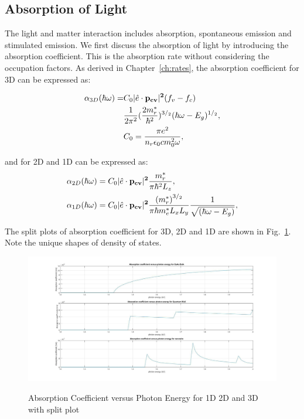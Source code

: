\subsection{Absorption of Light}

The light and matter interaction includes absorption, spontaneous emission and
stimulated emission. We first discuss the absorption of light by introducing
the absorption coefficient. This is the absorption rate without considering
the occupation factors. As derived in Chapter~\ref{ch:rates}, the absorption coefficient for 3D can be expressed as:


\begin{equation}
\begin{aligned}
    \alpha_{3D}(\hbar\omega)= & C_0{|\hat{e}\cdot\bf{p}_{cv}|^2}(f_v-f_c)\\
    & \frac{1}{2\pi^2}(\frac{2m_r^\ast}{\hbar^2})^{3/_2}(\hbar\omega-E_g)^{1/_2},\\
    & C_0=\frac{\pi{e^2}}{n_r\epsilon_0{c}{m_0^2}\omega},
\end{aligned}
\label{eq:two}
\end{equation}

and for 2D and 1D can be expressed as:
\begin{eqnarray}
\begin{aligned}
& \alpha_{2D}(\hbar\omega)=C_0{|\hat{e}\cdot\bf{p}_{cv}|^2}\frac{m_r^\ast}{\pi\hbar^2{L_z}},
\\
& \alpha_{1D}(\hbar\omega)=C_0{|\hat{e}\cdot\bf{p}_{cv}|^2}\frac{{(m_r^\ast)}^{3/_2}}{\pi\hbar{m_e^\ast}{L_x}{L_y}}\frac{1}{\sqrt{(\hbar\omega-E_g)}},
\end{aligned}
\label{eq:five}
\end{eqnarray}

The split plots of absorption coefficient for 3D, 2D and 1D are shown in
Fig.~\ref{absrate_split}. Note the unique shapes of density of states.

\begin{figure}
  \caption{Absorption Coefficient versus Photon Energy for 1D 2D and 3D with split plot}
  \centering
  \includegraphics[width=\textwidth]{pictures/LT/absrate_split}
  \label{absrate_split}
\end{figure}

